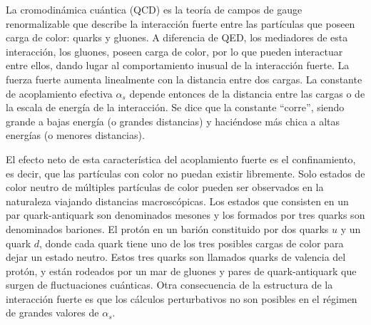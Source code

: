 
La cromodinámica cuántica (QCD) \cite{Ellis:1991qj} es la teoría de campos de gauge
renormalizable que describe la interacción fuerte entre las partículas que
poseen carga de color: quarks y gluones. A diferencia de QED, los mediadores
de esta interacción, los gluones, poseen carga de color, por lo que
pueden interactuar entre ellos, dando lugar al comportamiento inusual de la
interacción fuerte. La fuerza fuerte aumenta linealmente con la distancia entre
dos cargas. La constante de acoplamiento efectiva $\alpha_s$ depende entonces de
la distancia entre las cargas o de la escala de energía de la interacción. Se
dice que la constante ``corre'', siendo grande a bajas energía (o grandes
distancias) y haciéndose más chica a altas energías (o menores distancias).

El efecto neto de esta característica del acoplamiento fuerte es el
confinamiento, es decir, que las partículas con color no puedan existir
libremente. Solo estados de color neutro de múltiples partículas de color pueden
ser observados en la naturaleza viajando distancias macroscópicas. Los estados
que consisten en un par quark-antiquark son denominados mesones y  los
 formados por tres quarks son denominados bariones. El protón en un
barión constituido por dos quarks $u$ y un quark $d$, donde cada quark tiene uno de
los tres posibles cargas de color para dejar un estado neutro. Estos tres quarks
son llamados quarks de valencia del protón, y están rodeados por un mar
de gluones y pares de quark-antiquark que surgen de fluctuaciones cuánticas.
Otra consecuencia de la estructura de la interacción fuerte es que los cálculos
perturbativos no son posibles en el régimen de grandes valores de $\alpha_s$.

